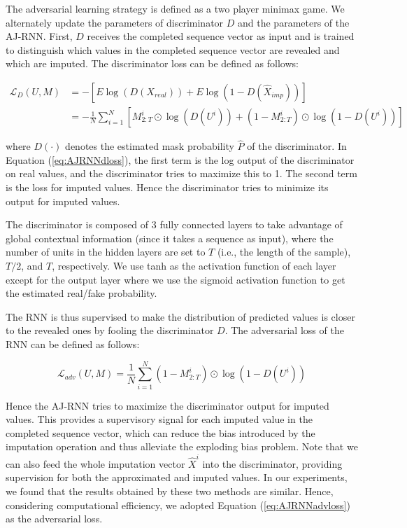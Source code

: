The adversarial learning strategy is defined as a two player minimax game.
We alternately update the parameters of discriminator $D$ and the parameters of the AJ-RNN.
First, $D$ receives the completed sequence vector as input and is trained to distinguish which values in the completed sequence vector are revealed and which are imputed. 
The discriminator loss can be defined as follows:

\begin{align}
  \mathcal{L}_{D}(U, M) & = - [E \log(D(X_{real})) + E \log(1 - D(\hat{X}_{imp}))] \label{eq:AJRNNdloss} \\ 
                        & = - \frac{1}{N} \sum_{i=1}^N \left[ M^i_{2:T} \odot \log(D(U^i)) + (1 - M^i_{2:T}) \odot \log(1-D(U^i)) \right]
\end{align}

where $D(\cdot)$ denotes the estimated mask probability $\hat{P}$ of the discriminator. 
In Equation (\ref{eq:AJRNNdloss}), the first term is the log output of the discriminator on real values, and the discriminator tries to maximize this to 1.
The second term is the loss for imputed values.
Hence the discriminator tries to minimize its output for imputed values.

The discriminator is composed of 3 fully connected layers to take advantage of global contextual information (since it takes a sequence as input), where the number of units in the hidden layers are set to $T$ (i.e., the length of the sample), $T/2$, and $T$, respectively.
We use tanh as the activation function of each layer except for the output layer where we use the sigmoid activation function to get the estimated real/fake probability.

The RNN is thus supervised to make the distribution of predicted values is closer to the revealed ones by fooling the discriminator $D$. 
The adversarial loss of the RNN can be defined as follows:

\begin{equation}
  \mathcal{L}_{adv}(U, M) = \frac{1}{N} \sum_{i=1}^N  (1 - M^i_{2:T}) \odot \log(1 - D(U^i))
  \label{eq:AJRNNadvloss}
\end{equation}

Hence the AJ-RNN tries to maximize the discriminator output for imputed values.
This provides a supervisory signal for each imputed value in the completed sequence vector, which can reduce the bias introduced by the imputation operation and thus alleviate the exploding bias problem.
Note that we can also feed the whole imputation vector $\hat{X}^i$ into the discriminator, providing supervision for both the approximated and imputed values. 
In our experiments, we found that the results obtained by these two methods are similar. 
Hence, considering computational efficiency, we adopted Equation (\ref{eq:AJRNNadvloss}) as the adversarial loss.

